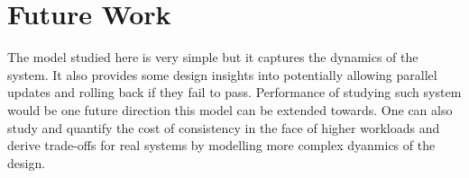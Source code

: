 \documentclass[conference]{IEEEtran}
\begin{document}
\section{Future Work}
The model studied here is very simple but it captures the dynamics of the system. It also provides some design insights into potentially allowing parallel updates and rolling back if they fail to pass. Performance of studying such system would be one future direction this model can be extended towards. One can also study and quantify the cost of consistency in the face of higher workloads and derive trade-offs for real systems by modelling more complex dyanmics of the design.

% 
% 
% 
% 






\end{document}
